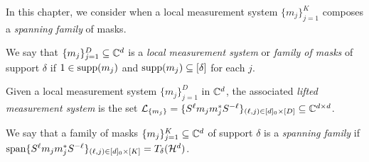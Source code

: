 In this chapter, we consider when a local measurement system $\{m_j\}_{j = 1}^K$ composes a \emph{spanning family} of masks.

\begin{definition}
  We say that $\{m_j\}_{j = 1}^D \subseteq \mathbb{C}^d$ is a \emph{local measurement system} or \emph{family of masks} of support $\delta$ if $1 \in \operatorname{supp}(m_j)$ and $\operatorname{supp}(m_j) \subseteq [\delta]$ for each $j$.
\end{definition}

\begin{definition}
  Given a local measurement system $\{m_j\}_{j = 1}^D$ in $\mathbb{C}^d$, the associated \emph{lifted measurement system} is the set $\mathcal{L}_{\{m_j\}} = \{S^{\ell} m_j m_j^* S^{- \ell}\}_{(\ell, j) \in [d]_0 \times [D]} \subseteq \mathbb{C}^{d \times d}$.
\end{definition}

\begin{definition}
  We say that a family of masks $\{m_j\}_{j = 1}^K \subseteq \mathbb{C}^d$ of support $\delta$ is a \emph{spanning family} if $\operatorname{span} \{S^\ell m_j m_j^* S^{-\ell}\}_{(\ell, j) \in [d]_0 \times [K]} = T_\delta(\mathcal{H}^d)$.
\end{definition}




